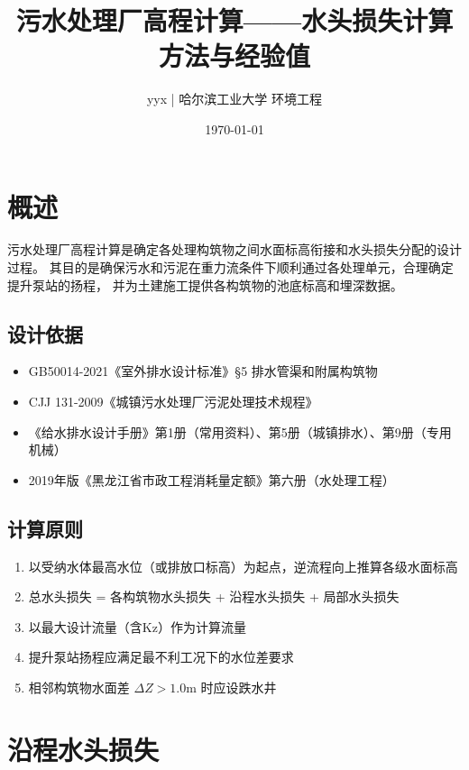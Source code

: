 \documentclass[12pt,a4paper]{ctexart}
\title{污水处理厂高程计算——水头损失计算方法与经验值}
\author{yyx | 哈尔滨工业大学 环境工程}
\date{\today}
\begin{document}
\maketitle

\tableofcontents
\newpage

\section{概述}

污水处理厂高程计算是确定各处理构筑物之间水面标高衔接和水头损失分配的设计过程。
其目的是确保污水和污泥在重力流条件下顺利通过各处理单元，合理确定提升泵站的扬程，
并为土建施工提供各构筑物的池底标高和埋深数据。

\subsection{设计依据}

\begin{itemize}[nosep]
    \item GB50014-2021《室外排水设计标准》§5 排水管渠和附属构筑物
    \item CJJ 131-2009《城镇污水处理厂污泥处理技术规程》
    \item 《给水排水设计手册》第1册（常用资料）、第5册（城镇排水）、第9册（专用机械）
    \item 2019年版《黑龙江省市政工程消耗量定额》第六册（水处理工程）
\end{itemize}

\subsection{计算原则}

\begin{enumerate}[nosep]
    \item 以受纳水体最高水位（或排放口标高）为起点，逆流程向上推算各级水面标高
    \item 总水头损失 = 各构筑物水头损失 + 沿程水头损失 + 局部水头损失
    \item 以最大设计流量（含Kz）作为计算流量
    \item 提升泵站扬程应满足最不利工况下的水位差要求
    \item 相邻构筑物水面差 $\Delta Z > 1.0$m 时应设跌水井
\end{enumerate}

\section{沿程水头损失}
\end{document}
